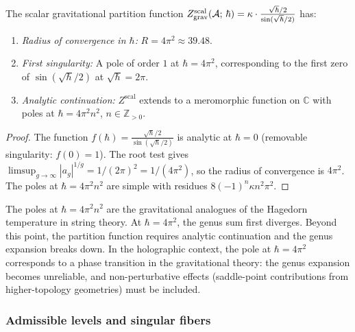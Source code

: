 \begin{proposition}
The scalar gravitational partition function $Z^{\mathrm{scal}}_{\mathrm{grav}}(\mathcal{A};\,\hbar) = \kappa \cdot \frac{\sqrt{\hbar}/2}{\sin(\sqrt{\hbar}/2)}$ has:
\begin{enumerate}[label=\textup{(\roman*)}]
\item \emph{Radius of convergence in $\hbar$:} $R = 4\pi^2 \approx 39.48$.
\item \emph{First singularity:} A pole of order $1$ at $\hbar = 4\pi^2$, corresponding to the first zero of $\sin(\sqrt{\hbar}/2)$ at $\sqrt{\hbar} = 2\pi$.
\item \emph{Analytic continuation:} $Z^{\mathrm{scal}}$ extends to a meromorphic function on $\mathbb{C}$ with poles at $\hbar = 4\pi^2 n^2$, $n \in \mathbb{Z}_{> 0}$.
\end{enumerate}
\end{proposition}

\begin{proof}
The function $f(\hbar) = \frac{\sqrt{\hbar}/2}{\sin(\sqrt{\hbar}/2)}$ is analytic at $\hbar = 0$ (removable singularity: $f(0) = 1$). The root test gives $\limsup_{g \to \infty} |a_g|^{1/g} = 1/(2\pi)^2 = 1/(4\pi^2)$, so the radius of convergence is $4\pi^2$. The poles at $\hbar = 4\pi^2 n^2$ are simple with residues $8(-1)^n \kappa n^2\pi^2$.
\end{proof}

\begin{remark}
The poles at $\hbar = 4\pi^2 n^2$ are the gravitational analogues of the Hagedorn temperature in string theory. At $\hbar = 4\pi^2$, the genus sum first diverges. Beyond this point, the partition function requires analytic continuation and the genus expansion breaks down. In the holographic context, the pole at $\hbar = 4\pi^2$ corresponds to a phase transition in the gravitational theory: the genus expansion becomes unreliable, and non-perturbative effects (saddle-point contributions from higher-topology geometries) must be included.
\end{remark}

\subsubsection{Admissible levels and singular fibers}

